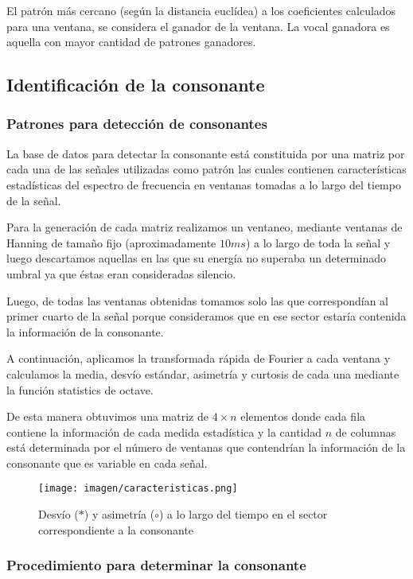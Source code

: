 \documentclass[conference,a4paper,10pt,oneside,final]{tfmpd}
\begin{document}
		El patrón más cercano (según la distancia euclídea) a los coeficientes
		calculados para una ventana, se considera el ganador de la ventana.
		La vocal ganadora es aquella con mayor cantidad de patrones ganadores.

	\subsection{Identificación de la consonante}
	\subsubsection{Patrones para detección de consonantes}

		La base de datos para detectar la consonante está constituida por una
		matriz por cada una de las señales utilizadas como patrón las cuales
		contienen características estadísticas del espectro de frecuencia en
		ventanas tomadas a lo largo del tiempo de la señal.

		Para la  generación de cada matriz realizamos un ventaneo, mediante
		ventanas de Hanning de tamaño fijo (aproximadamente $10 ms$) a lo largo
		de toda la señal y luego descartamos aquellas en las que su energía no
		superaba un determinado umbral ya que éstas eran consideradas silencio.

		Luego, de todas las ventanas obtenidas tomamos solo las que correspondían
		al primer cuarto de la señal porque consideramos que en ese sector
		estaría contenida la información de la consonante.

		A continuación, aplicamos la transformada rápida de Fourier a cada
		ventana y calculamos la media, desvío estándar, asimetría y curtosis
		de cada una mediante la función statistics de octave.

		De esta manera obtuvimos una matriz de $4 \times n$ elementos donde cada fila
		contiene la información de cada medida estadística y la cantidad $n$
		de columnas está determinada por el número de ventanas que contendrían
		la información de la consonante que es variable en cada señal.

		
		\begin{figure}
			\texttt{[image: imagen/caracteristicas.png]}
			\caption{
				Desvío ($*$) y asimetría ($\circ$) a lo largo del tiempo
				en el sector correspondiente a la consonante
			}
			\label{fig:tracto}
		\end{figure}


	\subsubsection{Procedimiento para determinar la consonante}
\end{document}
